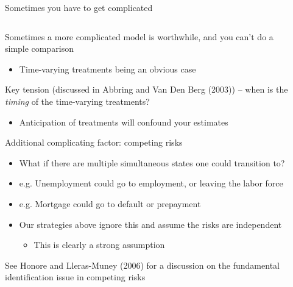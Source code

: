 \documentclass[notes,11pt, aspectratio=169]{beamer}
\newenvironment{wideitemize}{\itemize\addtolength{\itemsep}{10pt}}{\enditemize}
\begin{document}
\begin{frame}{Sometimes you have to get complicated}
  \begin{columns}[T] %
    \begin{column}{0.9\textwidth}
      \begin{wideitemize}
      \item Sometimes a more complicated model is worthwhile, and you can't do a simple comparison
        \begin{itemize}
        \item Time-varying treatments being an obvious case
        \end{itemize}
      \item Key tension (discussed in Abbring and Van Den Berg (2003))
        -- when is the \emph{timing} of the time-varying treatments?
        \begin{itemize}
        \item Anticipation of treatments will confound your estimates
        \end{itemize}
      \item Additional complicating factor: competing risks
        \begin{itemize}
        \item What if there are multiple simultaneous states one could transition to?
        \item e.g. Unemployment could go to employment, or leaving the labor force
        \item e.g. Mortgage could go to default or prepayment
        \item Our strategies above ignore this and assume the risks
          are independent
          \begin{itemize}
          \item This is clearly a strong assumption
          \end{itemize}
        \end{itemize}
      \item See Honore and Lleras-Muney (2006) for a discussion on the
        fundamental identification issue in competing risks
      \end{wideitemize}
    \end{column}%
    \hfill%
    \begin{column}{.7\textwidth}
    \end{column}
  \end{columns}
\end{frame}
\end{document}
